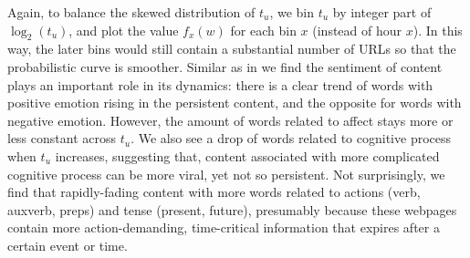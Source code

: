 \documentclass[phd,tocprelim]{cornell}
\renewcommand{\caption}[1]{\singlespacing\hangcaption{#1}\normalspacing}
\begin{document}
\begin{figure}[htb!]
 \centering
 \caption{Trending LIWC categories}
 \label{fig:liwc-trend}
\end{figure}

Again, to balance the skewed distribution of $t_u$, we bin $t_u$ by integer part of $\log_2(t_u)$, and plot the value $f_x(w)$ for each bin $x$ (instead of hour $x$). In this way, the later bins would still contain a substantial number of URLs so that the probabilistic curve is smoother. Similar as in \cite{Berger-2010,Hansen:11} we find the sentiment of content plays an important role in its dynamics: there is a clear trend of words with positive emotion rising in the persistent content, and the opposite for words with negative emotion. However, the amount of words related to affect stays more or less constant across $t_u$. We also see a drop of words related to cognitive process  when $t_u$ increases, suggesting that, content associated with more complicated cognitive process can be more viral\cite{Berger-2010}, yet not so persistent. Not surprisingly, we find that rapidly-fading content with more words related to actions (verb, auxverb, preps) and tense (present, future), presumably because these webpages contain more action-demanding, time-critical information that expires after a certain event or time.





\end{document}
